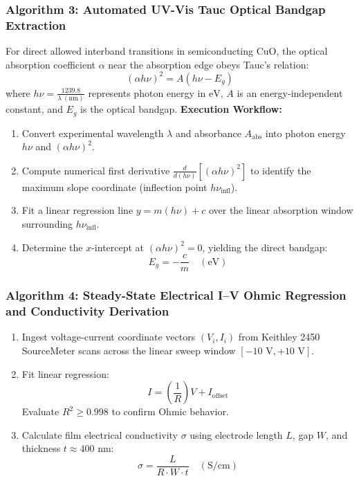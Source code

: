 \documentclass[12pt,a4paper,oneside]{report}
\begin{document}
{{{\subsubsection{Algorithm 3: Automated UV-Vis Tauc Optical Bandgap Extraction}
For direct allowed interband transitions in semiconducting $\text{CuO}$, the optical absorption coefficient $\alpha$ near the absorption edge obeys Tauc's relation:
\begin{equation}
    (\alpha h\nu)^2 = A (h\nu - E_g)
    \label{eq:tauc_equation}
\end{equation}
where $h\nu = \frac{1239.8}{\lambda\ (\text{nm})}$ represents photon energy in $\text{eV}$, $A$ is an energy-independent constant, and $E_g$ is the optical bandgap.
\noindent\textbf{Execution Workflow:}
\begin{enumerate}
    \item Convert experimental wavelength $\lambda$ and absorbance $A_{\text{abs}}$ into photon energy $h\nu$ and $(\alpha h\nu)^2$.
    \item Compute numerical first derivative $\frac{d}{d(h\nu)}[(\alpha h\nu)^2]$ to identify the maximum slope coordinate (inflection point $h\nu_{\text{infl}}$).
    \item Fit a linear regression line $y = m(h\nu) + c$ over the linear absorption window surrounding $h\nu_{\text{infl}}$.
    \item Determine the $x$-intercept at $(\alpha h\nu)^2 = 0$, yielding the direct bandgap:
    \begin{equation}
        E_g = -\frac{c}{m} \quad (\text{eV})
    \end{equation}
\end{enumerate}

\subsubsection{Algorithm 4: Steady-State Electrical I--V Ohmic Regression and Conductivity Derivation}
\begin{enumerate}
    \item Ingest voltage-current coordinate vectors $(V_i, I_i)$ from Keithley 2450 SourceMeter scans across the linear sweep window $[-10\text{ V}, +10\text{ V}]$.
    \item Fit linear regression:
    \begin{equation}
        I = \left(\frac{1}{R}\right) V + I_{\text{offset}}
    \end{equation}
    Evaluate $R^2 \ge 0.998$ to confirm Ohmic behavior.
    \item Calculate film electrical conductivity $\sigma$ using electrode length $L$, gap $W$, and thickness $t \approx 400\text{ nm}$:
    \begin{equation}
        \sigma = \frac{L}{R \cdot W \cdot t} \quad (\text{S/cm})
    \end{equation}
\end{enumerate}

}}}
\end{document}
